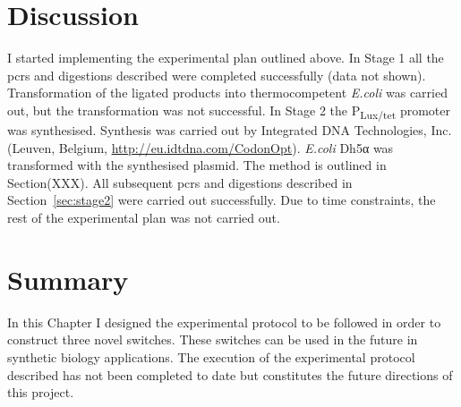 
\clearpage
\section{Discussion}

I started implementing the experimental plan outlined above. In Stage 1 all the \acrshort{pcr}s and digestions described were completed successfully (data not shown). Transformation of the ligated products into thermocompetent \textit{E.coli} was carried out, but the transformation was not successful. In Stage 2 the P\textsubscript{Lux/tet} promoter was synthesised. Synthesis was carried out by Integrated DNA Technologies, Inc. (Leuven, Belgium, \url{http://eu.idtdna.com/CodonOpt}). \textit{E.coli} Dh5α was transformed with the synthesised plasmid. The method is outlined in Section(XXX). All subsequent \acrshort{pcr}s and digestions described in Section~\ref{sec:stage2} were carried out successfully. Due to time constraints, the rest of the experimental plan was not carried out.



\section{Summary}

In this Chapter I designed the experimental protocol to be followed in order to construct three novel switches. These switches can be used in the future in synthetic biology applications. The execution of the experimental protocol described has not been completed to date but constitutes the future directions of this project.


